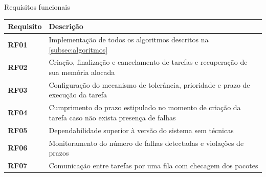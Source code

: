 \begin{quadro}[H]
    \centering
    \caption{Requisitos funcionais}
    \begin{tabular}{|p{}|p{}|}
        \hline
        \rowcolor[HTML]{C0C0C0}
        \textbf{Requisito} & \textbf{Descrição}  \\
        \hline
        
        \textbf{RF01} & Implementação de todos os algoritmos descritos na \autoref{subsec:algoritmos} \\ 
        \hline

        \textbf{RF02} & Criação, finalização e cancelamento de tarefas e recuperação de sua memória alocada \\
        \hline
        
        \textbf{RF03} & Configuração do mecanismo de tolerância, prioridade e prazo de execução da tarefa \\
        \hline

        \textbf{RF04} & Cumprimento do prazo estipulado no momento de criação da tarefa caso não exista presença de falhas \\
        \hline

        \textbf{RF05} & Dependabilidade superior à versão do sistema sem técnicas \\
        \hline
        
        \textbf{RF06} & Monitoramento do número de falhas detectadas e violações de prazos  \\
        \hline
        
        \textbf{RF07} & Comunicação entre tarefas por uma fila com checagem dos pacotes \\
        \hline
    \end{tabular}
    \label{tab:rf}
\end{quadro}

